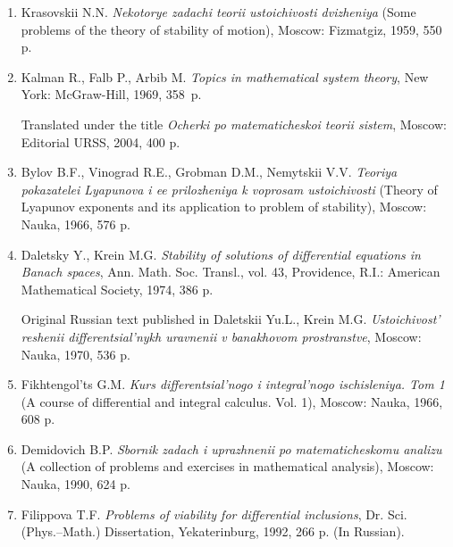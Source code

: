 \documentclass[12pt,a4paper,twoside]{article}  %
\begin{document}
\begin{enumerate}
\setlength{\itemsep}{0em}
\parskip=0pt

\item
Krasovskii N.N. {\it Nekotorye zadachi teorii ustoichivosti dvizheniya} (Some problems of the theory of stability of motion), Moscow: Fizmatgiz, 1959, 550 p.


\item Kalman R., Falb P., Arbib M. {\it Topics in mathematical system theory}, New York: McGraw-Hill, 1969, 358~p.

Translated under the title {\it Ocherki po matematicheskoi teorii sistem}, Moscow: Editorial URSS, 2004, 400 p.


\item
Bylov B.F., Vinograd R.E., Grobman D.M., Nemytskii V.V. {\it Teoriya pokazatelei Lyapunova  i ee prilozhe\-niya k voprosam ustoichivosti}
(Theory of Lyapunov exponents and its application to problem of stability), Moscow: Nauka, 1966, 576 p.


\item
Daletsky Y., Krein M.G. {\it Stability of solutions of differential equations in Banach spaces}, Ann. Math. Soc. Transl., vol. 43, Providence, R.I.: American Mathematical Society, 1974, 386 p.

Original Russian text published in Daletskii Yu.L., Krein M.G. {\it Ustoichivost' reshenii differentsial'nykh uravnenii v banakhovom prostranstve}, Moscow: Nauka, 1970, 536 p.


\item
Fikhtengol'ts G.M. {\it Kurs differentsial'nogo i integral'nogo ischisleniya. Tom 1} (A course of differential and integral calculus. Vol. 1), Moscow: Nauka, 1966, 608 p.

\item
Demidovich B.P. {\it Sbornik zadach i uprazhnenii po matematicheskomu analizu} (A collection of problems and exercises in mathematical analysis), Moscow: Nauka, 1990, 624 p.


\item
Filippova T.F. {\it Problems of viability for differential inclusions},  Dr. Sci. (Phys.–Math.) Dissertation, Yekaterinburg, 1992, 266 p. (In Russian).


\end{enumerate}
\end{document}
